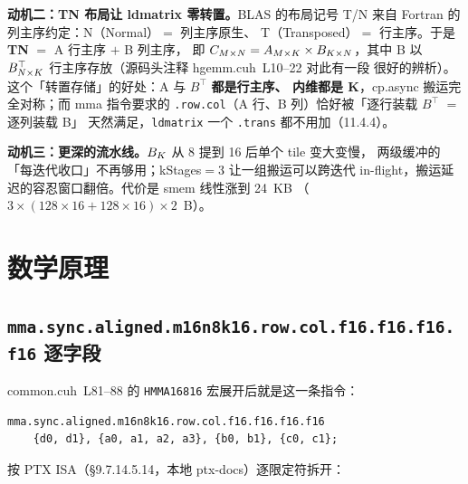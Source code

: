 \textbf{动机二：TN 布局让 ldmatrix 零转置。}\allowbreak{}BLAS 的布局记号
T/N 来自 Fortran 的列主序约定：N（Normal）$=$ 列主序原生、
T（Transposed）$=$ 行主序。于是 \textbf{TN} $=$ A 行主序 $+$ B 列主序，
即 $C\sb {M\times N} = A\sb {M\times K}\times B\sb {K\times N}$，其中 B 以
$B^{\top}\sb {N\times K}$ 行主序存放（源码头注释 hgemm.cuh~L10--22 对此有一段
很好的辨析）。这个「转置存储」的好处：A 与 $B^{\top}$ \textbf{都是行主序、
内维都是 K}，cp.async 搬运完全对称；而 mma 指令要求的
\texttt{.row.col}（A 行、B 列）恰好被「逐行装载 $B^{\top}$ $=$ 逐列装载 B」
天然满足，\texttt{ldmatrix} 一个 \texttt{.trans} 都不用加（11.4.4）。

\textbf{动机三：更深的流水线。}$B\sb K$ 从 8 提到 16 后单个 tile 变大变慢，
两级缓冲的「每迭代收口」不再够用；kStages$=$3 让一组搬运可以跨迭代
in-flight，搬运延迟的容忍窗口翻倍。代价是 smem 线性涨到 24~KB
（$3\times(128{\times}16{+}128{\times}16)\times2$~B）。

\section{数学原理}

\subsection{\texttt{mma.\allowbreak{}sync.\allowbreak{}aligned.\allowbreak{}m16n8k16.row.\allowbreak{}col.\allowbreak{}f16.f16.f16.f16} 逐字段}

common.cuh~L81--88 的 \texttt{HMMA16816} 宏展开后就是这一条指令：

\begin{lstlisting}[language={}]
mma.sync.aligned.m16n8k16.row.col.f16.f16.f16.f16
    {d0, d1}, {a0, a1, a2, a3}, {b0, b1}, {c0, c1};
\end{lstlisting}

按 PTX ISA（§9.7.14.5.14，本地 ptx-docs）逐限定符拆开：

